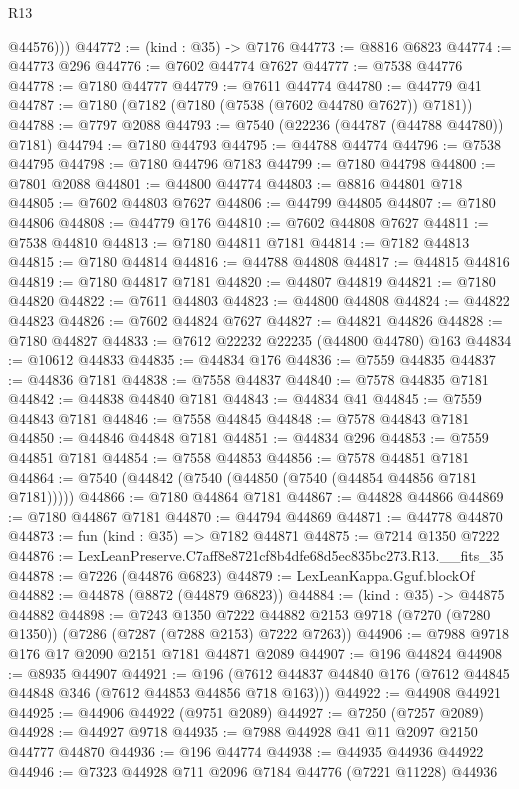 \begin{lexlean}{R13}
\begin{coremodule}
          @44576)))
@44772 := (kind : @35) -> @7176
@44773 := @8816 @6823
@44774 := @44773 @296
@44776 := @7602 @44774 @7627
@44777 := @7538 @44776
@44778 := @7180 @44777
@44779 := @7611 @44774
@44780 := @44779 @41
@44787 := @7180 (@7182 (@7180 (@7538 (@7602 @44780 @7627)) @7181))
@44788 := @7797 @2088
@44793 := @7540 (@22236 (@44787 (@44788 @44780)) @7181)
@44794 := @7180 @44793
@44795 := @44788 @44774
@44796 := @7538 @44795
@44798 := @7180 @44796 @7183
@44799 := @7180 @44798
@44800 := @7801 @2088
@44801 := @44800 @44774
@44803 := @8816 @44801 @718
@44805 := @7602 @44803 @7627
@44806 := @44799 @44805
@44807 := @7180 @44806
@44808 := @44779 @176
@44810 := @7602 @44808 @7627
@44811 := @7538 @44810
@44813 := @7180 @44811 @7181
@44814 := @7182 @44813
@44815 := @7180 @44814
@44816 := @44788 @44808
@44817 := @44815 @44816
@44819 := @7180 @44817 @7181
@44820 := @44807 @44819
@44821 := @7180 @44820
@44822 := @7611 @44803
@44823 := @44800 @44808
@44824 := @44822 @44823
@44826 := @7602 @44824 @7627
@44827 := @44821 @44826
@44828 := @7180 @44827
@44833 := @7612 @22232 @22235 (@44800 @44780) @163
@44834 := @10612 @44833
@44835 := @44834 @176
@44836 := @7559 @44835
@44837 := @44836 @7181
@44838 := @7558 @44837
@44840 := @7578 @44835 @7181
@44842 := @44838 @44840 @7181
@44843 := @44834 @41
@44845 := @7559 @44843 @7181
@44846 := @7558 @44845
@44848 := @7578 @44843 @7181
@44850 := @44846 @44848 @7181
@44851 := @44834 @296
@44853 := @7559 @44851 @7181
@44854 := @7558 @44853
@44856 := @7578 @44851 @7181
@44864 := @7540 (@44842 (@7540 (@44850 (@7540 (@44854 @44856 @7181 @7181)))))
@44866 := @7180 @44864 @7181
@44867 := @44828 @44866
@44869 := @7180 @44867 @7181
@44870 := @44794 @44869
@44871 := @44778 @44870
@44873 := fun (kind : @35) => @7182 @44871
@44875 := @7214 @1350 @7222
@44876 := LexLeanPreserve.C7aff8e8721cf8b4dfe68d5ec835bc273.R13.__fits_35
@44878 := @7226 (@44876 @6823)
@44879 := LexLeanKappa.Gguf.blockOf
@44882 := @44878 (@8872 (@44879 @6823))
@44884 := (kind : @35) -> @44875 @44882
@44898 := @7243
    @1350
    @7222
    @44882
    @2153
    @9718
    (@7270 (@7280 @1350))
    (@7286 (@7287 (@7288 @2153) @7222 @7263))
@44906 := @7988 @9718 @176 @17 @2090 @2151 @7181 @44871 @2089
@44907 := @196 @44824
@44908 := @8935 @44907
@44921 := @196 (@7612 @44837 @44840 @176 (@7612 @44845 @44848 @346 (@7612 @44853 @44856 @718 @163)))
@44922 := @44908 @44921
@44925 := @44906 @44922 (@9751 @2089)
@44927 := @7250 (@7257 @2089)
@44928 := @44927 @9718
@44935 := @7988 @44928 @41 @11 @2097 @2150 @44777 @44870
@44936 := @196 @44774
@44938 := @44935 @44936 @44922
@44946 := @7323 @44928 @711 @2096 @7184 @44776 (@7221 @11228) @44936

\end{coremodule}
\end{lexlean}
